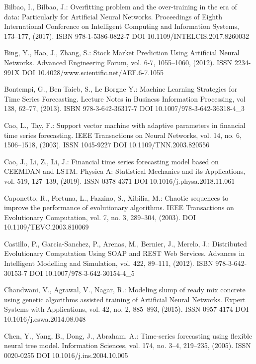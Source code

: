 \begin{thebibliography}{99.}
 Bilbao, I., Bilbao, J.: Overfitting problem and the over-training in the era of data: Particularly for Artificial Neural Networks. Proceedings of Eighth International Conference on Intelligent Computing and Information Systems, 173--177, (2017). ISBN 978-1-5386-0822-7 DOI 10.1109/INTELCIS.2017.8260032

 Bing, Y., Hao, J., Zhang, S.: Stock Market Prediction Using Artificial Neural Networks. Advanced Engineering Forum, vol. 6-7, 1055--1060, (2012). ISSN 2234-991X DOI 10.4028/www.scientific.net/AEF.6-7.1055

 Bontempi, G., Ben Taieb, S., Le Borgne Y.: Machine Learning Strategies for Time Series Forecasting. Lecture Notes in Business Information Processing, vol 138, 62--77, (2013). ISBN 978-3-642-36317-7 DOI 10.1007/978-3-642-36318-4\_3

 Cao, L., Tay, F.: Support vector machine with adaptive parameters in financial time series forecasting. IEEE Transactions on Neural Networks, vol. 14, no. 6, 1506--1518, (2003). ISSN 1045-9227 DOI 10.1109/TNN.2003.820556

 Cao, J., Li, Z., Li, J.: Financial time series forecasting model based on CEEMDAN and LSTM. Physica A: Statistical Mechanics and its Applications, vol. 519, 127--139, (2019). ISSN 0378-4371 DOI 10.1016/j.physa.2018.11.061

 Caponetto, R., Fortuna, L., Fazzino, S., Xibilia, M.: Chaotic sequences to improve the performance of evolutionary algorithms. IEEE Transactions on Evolutionary Computation, vol. 7, no. 3, 289--304, (2003). DOI 10.1109/TEVC.2003.810069

 Castillo, P., Garcia-Sanchez, P., Arenas, M., Bernier, J., Merelo, J.: Distributed Evolutionary Computation Using SOAP and REST Web Services. Advances in Intelligent Modelling and Simulation, vol. 422, 89--111, (2012). ISBN 978-3-642-30153-7 DOI 10.1007/978-3-642-30154-4\_5

 Chandwani, V., Agrawal, V., Nagar, R.: Modeling slump of ready mix concrete using genetic algorithms assisted training of Artificial Neural Networks. Expert Systems with Applications, vol. 42, no. 2, 885--893, (2015). ISSN 0957-4174 DOI 10.1016/j.eswa.2014.08.048

 Chen, Y., Yang, B., Dong, J., Abraham. A.: Time-series forecasting using flexible neural tree model. Information Sciences, vol. 174, no. 3--4, 219--235, (2005). ISSN 0020-0255 DOI 10.1016/j.ins.2004.10.005


\end{thebibliography}
